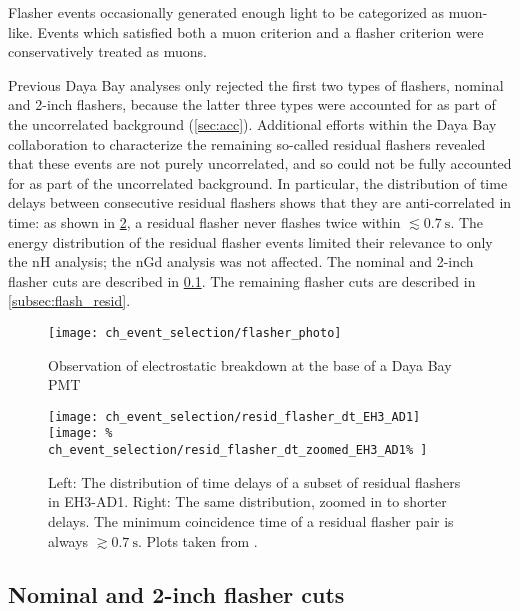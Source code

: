 Flasher events occasionally generated enough light to be categorized as muon-like.
Events which satisfied both a muon criterion and a flasher criterion
were conservatively treated as muons.

Previous Daya Bay analyses only rejected the first two types of flashers,
nominal and 2-inch flashers,
because the latter three types were accounted for
as part of the uncorrelated background (\cref{sec:acc}).
Additional efforts within the Daya Bay collaboration
to characterize the remaining so-called residual flashers
revealed that these events are not purely uncorrelated,
and so could not be fully accounted for as part of the uncorrelated background.
In particular, the distribution of time delays
between consecutive residual flashers
shows that they are anti-correlated in time:
as shown in \cref{fig:flasher_anticorr},
a residual flasher never flashes twice within $\lesssim \SI{0.7}{\s}$.
The energy distribution of the residual flasher events
limited their relevance to only the nH analysis; the nGd analysis was not affected.
The nominal and 2-inch flasher cuts are described in \cref{subsec:flash_nominal}.
The remaining flasher cuts are described in \cref{subsec:flash_resid}.

\begin{figure}
    \centering
    \texttt{[image: ch\_event\_selection/flasher\_photo]}
    \caption{
        Observation of electrostatic breakdown at the base of a Daya Bay PMT
        \cite{flasherphotos_docdb}
    }
    \label{fig:flasher_photo}
\end{figure}

\begin{figure}
    \texttt{[image: ch\_event\_selection/resid\_flasher\_dt\_EH3\_AD1]}
    \texttt{[image: \%
        ch\_event\_selection/resid\_flasher\_dt\_zoomed\_EH3\_AD1\%
    ]}
    \caption{
        Left: The distribution of time delays
        of a subset of residual flashers in EH3-AD1.
        Right: The same distribution, zoomed in to shorter delays.
        The minimum coincidence time of a residual flasher pair is always
        $\gtrsim \SI{0.7}{\s}$.
        Plots taken from \cite{beda_resid_flasher_dt}.
    }
    \label{fig:flasher_anticorr}
\end{figure}

\subsection{Nominal and 2-inch flasher cuts}
\label{subsec:flash_nominal}

